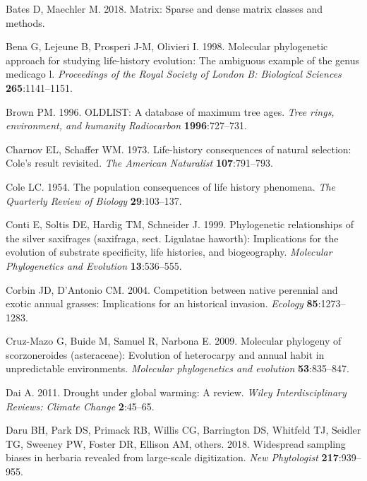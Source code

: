 \documentclass[man,floatsintext]{apa6}
\theoremstyle{definition}
\theoremstyle{definition}
\theoremstyle{definition}
\theoremstyle{remark}
\begin{document}
\leavevmode\hypertarget{ref-R-Matrix}{}%
Bates D, Maechler M. 2018. Matrix: Sparse and dense matrix classes and
methods.

\leavevmode\hypertarget{ref-bena1998molecular}{}%
Bena G, Lejeune B, Prosperi J-M, Olivieri I. 1998. Molecular
phylogenetic approach for studying life-history evolution: The ambiguous
example of the genus medicago l. \emph{Proceedings of the Royal Society
of London B: Biological Sciences} \textbf{265}:1141--1151.

\leavevmode\hypertarget{ref-brown1996oldlist}{}%
Brown PM. 1996. OLDLIST: A database of maximum tree ages. \emph{Tree
rings, environment, and humanity Radiocarbon} \textbf{1996}:727--731.

\leavevmode\hypertarget{ref-charnov1973life}{}%
Charnov EL, Schaffer WM. 1973. Life-history consequences of natural
selection: Cole's result revisited. \emph{The American Naturalist}
\textbf{107}:791--793.

\leavevmode\hypertarget{ref-cole1954population}{}%
Cole LC. 1954. The population consequences of life history phenomena.
\emph{The Quarterly Review of Biology} \textbf{29}:103--137.

\leavevmode\hypertarget{ref-conti1999phylogenetic}{}%
Conti E, Soltis DE, Hardig TM, Schneider J. 1999. Phylogenetic
relationships of the silver saxifrages (saxifraga, sect. Ligulatae
haworth): Implications for the evolution of substrate specificity, life
histories, and biogeography. \emph{Molecular Phylogenetics and
Evolution} \textbf{13}:536--555.

\leavevmode\hypertarget{ref-corbin2004competition}{}%
Corbin JD, D'Antonio CM. 2004. Competition between native perennial and
exotic annual grasses: Implications for an historical invasion.
\emph{Ecology} \textbf{85}:1273--1283.

\leavevmode\hypertarget{ref-cruz2009molecular}{}%
Cruz-Mazo G, Buide M, Samuel R, Narbona E. 2009. Molecular phylogeny of
scorzoneroides (asteraceae): Evolution of heterocarpy and annual habit
in unpredictable environments. \emph{Molecular phylogenetics and
evolution} \textbf{53}:835--847.

\leavevmode\hypertarget{ref-dai2011drought}{}%
Dai A. 2011. Drought under global warming: A review. \emph{Wiley
Interdisciplinary Reviews: Climate Change} \textbf{2}:45--65.

\leavevmode\hypertarget{ref-daru2018widespread}{}%
Daru BH, Park DS, Primack RB, Willis CG, Barrington DS, Whitfeld TJ,
Seidler TG, Sweeney PW, Foster DR, Ellison AM, others. 2018. Widespread
sampling biases in herbaria revealed from large-scale digitization.
\emph{New Phytologist} \textbf{217}:939--955.
\end{document}
